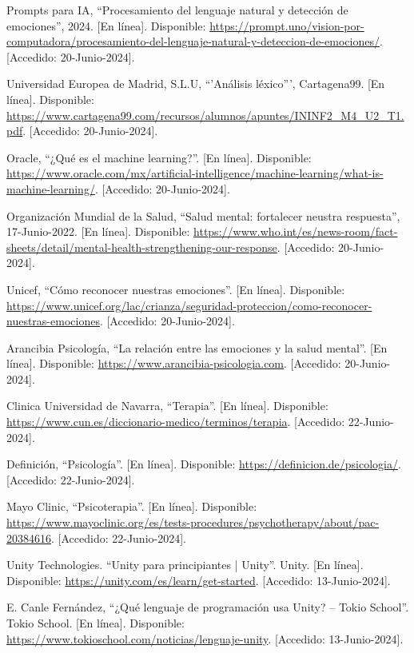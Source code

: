 \documentclass[12pt,twoside]{article}
\begin{document}
\begin{thebibliography}{10}
	Prompts para IA, ``Procesamiento del lenguaje natural y detección de emociones'', 2024. [En línea]. Disponible: \url{https://prompt.uno/vision-por-computadora/procesamiento-del-lenguaje-natural-y-deteccion-de-emociones/}. [Accedido: 20-Junio-2024].
	
	Universidad Europea de Madrid, S.L.U, ``'Análisis léxico''', Cartagena99. [En línea]. Disponible: \url{https://www.cartagena99.com/recursos/alumnos/apuntes/ININF2_M4_U2_T1.pdf}. [Accedido: 20-Junio-2024].
	
	Oracle, ``¿Qué es el machine learning?''. [En línea]. Disponible: \url{https://www.oracle.com/mx/artificial-intelligence/machine-learning/what-is-machine-learning/}. [Accedido: 20-Junio-2024].
	
	Organización Mundial de la Salud, ``Salud mental: fortalecer neustra respuesta'', 17-Junio-2022. [En línea]. Disponible: \url{https://www.who.int/es/news-room/fact-sheets/detail/mental-health-strengthening-our-response}. [Accedido: 20-Junio-2024].
	
	Unicef, ``Cómo reconocer nuestras emociones''. [En línea]. Disponible: \url{https://www.unicef.org/lac/crianza/seguridad-proteccion/como-reconocer-nuestras-emociones}. [Accedido: 20-Junio-2024].
	
	Arancibia Psicología, ``La relación entre las emociones y la salud mental''. [En línea]. Disponible: \url{https://www.arancibia-psicologia.com}. [Accedido: 20-Junio-2024].
	
	Clinica Universidad de Navarra, ``Terapia''. [En línea]. Disponible: \url{https://www.cun.es/diccionario-medico/terminos/terapia}. [Accedido: 22-Junio-2024].
	
	Definición, ``Psicología''. [En línea]. Disponible: \url{https://definicion.de/psicologia/}. [Accedido: 22-Junio-2024].
	
	Mayo Clinic, ``Psicoterapia''. [En línea]. Disponible: \url{https://www.mayoclinic.org/es/tests-procedures/psychotherapy/about/pac-20384616}. [Accedido: 22-Junio-2024].
	
	Unity Technologies. ``Unity para principiantes | Unity''. Unity. [En línea]. Disponible: \url{https://unity.com/es/learn/get-started}. [Accedido: 13-Junio-2024].
	
	E. Canle Fernández, ``¿Qué lenguaje de programación usa Unity? – Tokio School''. Tokio School. [En línea]. Disponible: \url{https://www.tokioschool.com/noticias/lenguaje-unity}. [Accedido: 13-Junio-2024].
	

\end{thebibliography}
\end{document}
